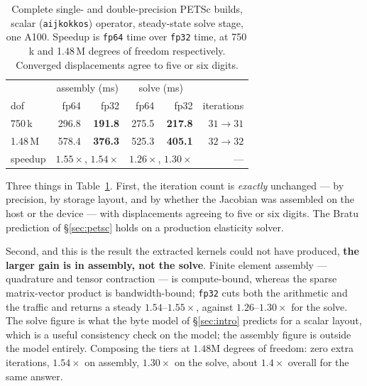 \documentclass[11pt]{article}
\begin{document}
\begin{table}[t]
\centering\small
\begin{tabular}{@{}lrrrrr@{}}
\toprule
& \multicolumn{2}{c}{assembly (ms)} & \multicolumn{2}{c}{solve (ms)} & \\
dof & fp64 & fp32 & fp64 & fp32 & iterations\\
\midrule
750\,k & 296.8 & \textbf{191.8} & 275.5 & \textbf{217.8} & $31 \to 31$\\
1.48\,M & 578.4 & \textbf{376.3} & 525.3 & \textbf{405.1} & $32 \to 32$\\
\midrule
speedup & \multicolumn{2}{c}{$1.55\times$, $1.54\times$} & \multicolumn{2}{c}{$1.26\times$, $1.30\times$} & ---\\
\bottomrule
\end{tabular}
\caption{Complete single- and double-precision PETSc builds, scalar
(\texttt{aijkokkos}) operator, steady-state solve stage, one A100. Speedup is
\texttt{fp64} time over \texttt{fp32} time, at 750\,k and 1.48\,M degrees of
freedom respectively. Converged displacements agree to five or six digits.}
\label{tab:e2e}
\end{table}

Three things in Table~\ref{tab:e2e}. First, the iteration count is \emph{exactly}
unchanged --- by precision, by storage layout, and by whether the Jacobian was
assembled on the host or the device --- with displacements agreeing to five or
six digits. The Bratu prediction of \S\ref{sec:petsc} holds on a production
elasticity solver.

Second, and this is the result the extracted kernels could not have produced,
\textbf{the larger gain is in assembly, not the solve}. Finite element assembly
--- quadrature and tensor contraction --- is compute-bound, whereas the sparse
matrix-vector product is bandwidth-bound; \texttt{fp32} cuts both the arithmetic
and the traffic and returns a steady $1.54$--$1.55\times$, against
$1.26$--$1.30\times$ for the solve. The solve figure is what the byte model of
\S\ref{sec:intro} predicts for a scalar layout, which is a useful consistency
check on the model; the assembly figure is outside the model entirely. Composing
the tiers at $1.48$M degrees of freedom: zero extra iterations, $1.54\times$ on
assembly, $1.30\times$ on the solve, about $1.4\times$ overall for the same
answer.
\end{document}
